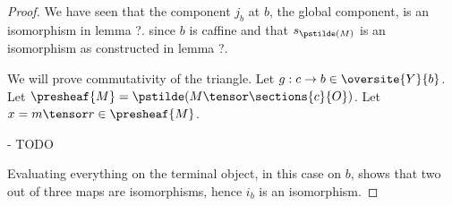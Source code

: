 \begin{proof}
We have seen that the component $j_b$ at $b$, the global component, 
is an isomorphism in lemma ?. since $b$ is caffine 
and that $s_{\pstilde(M)}$ is an isomorphism as constructed in lemma ?.

We will prove commutativity of the triangle.
Let $g: c \rightarrow b \in \oversite{Y}{b}$.
Let $\presheaf{M} = \pstilde( M \tensor \sections{c}{O})$.
Let $x = m \tensor r \in \presheaf{M}$.

- TODO%

Evaluating everything on the terminal object, in this case on $b$, 
shows that two out of three maps are isomorphisms, hence $i_b$ is an isomorphism.
\end{proof}





